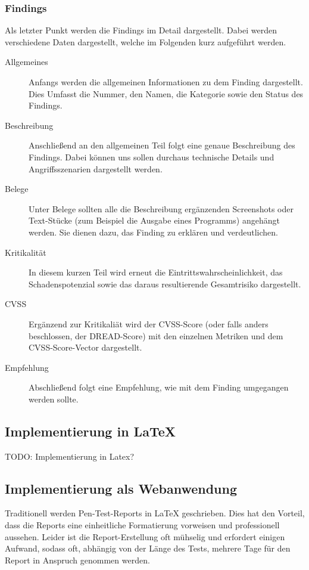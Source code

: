 	\subsubsection{Findings}\label{ref:penBerFind}
	Als letzter Punkt werden die Findings im Detail dargestellt. Dabei werden verschiedene Daten dargestellt, welche im Folgenden kurz aufgeführt werden.
	\begin{description}
		\item[Allgemeines] Anfangs werden die allgemeinen Informationen zu dem Finding dargestellt. Dies Umfasst die Nummer, den Namen, die Kategorie sowie den Status des Findings.
		\item[Beschreibung] Anschließend an den allgemeinen Teil folgt eine genaue Beschreibung des Findings. Dabei können uns sollen durchaus technische Details und Angriffsszenarien dargestellt werden.
		\item[Belege] Unter Belege sollten alle die Beschreibung ergänzenden Screenshots oder Text-Stücke (zum Beispiel die Ausgabe eines Programms) angehängt werden. Sie dienen dazu, das Finding zu erklären und verdeutlichen.
		\item[Kritikalität] In diesem kurzen Teil wird erneut die Eintrittswahrscheinlichkeit, das Schadenspotenzial sowie das daraus resultierende Gesamtrisiko dargestellt.
		\item[CVSS] Ergänzend zur Kritikaliät wird der CVSS-Score (oder falls anders beschlossen, der DREAD-Score) mit den einzelnen Metriken und dem CVSS-Score-Vector dargestellt.
		\item[Empfehlung] Abschließend folgt eine Empfehlung, wie mit dem Finding umgegangen werden sollte.
	\end{description}

	\subsection{Implementierung in LaTeX}
	TODO: Implementierung in Latex?	
	
	\subsection{Implementierung als Webanwendung}
	Traditionell werden Pen-Test-Reports in LaTeX geschrieben. Dies hat den Vorteil, dass die Reports eine einheitliche Formatierung vorweisen und professionell aussehen. Leider ist die Report-Erstellung oft mühselig und erfordert einigen Aufwand, sodass oft, abhängig von der Länge des Tests, mehrere Tage für den Report in Anspruch genommen werden.\\
	
